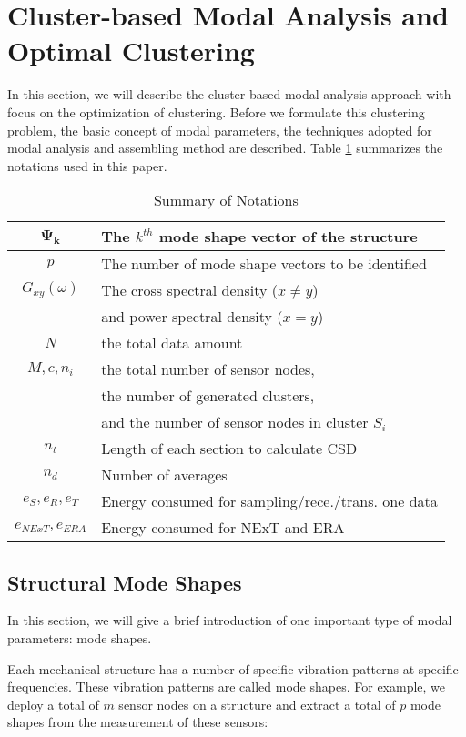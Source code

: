 \section{Cluster-based Modal Analysis and Optimal Clustering}
\label{sec:problem}
In this section, we will describe the cluster-based modal analysis approach with focus on the optimization of clustering. Before we formulate this clustering problem, the basic concept of modal parameters, the techniques adopted for modal analysis and assembling method are described. Table \ref{tab:Table1} summarizes the notations used in this paper.

\begin{table}
	\centering
\begin{tabular}{|c|l|}
\hline
\(\mathbf{\Psi_k}\)& The \(k^{th}\) mode shape vector of the structure\\
\hline
\(p\) &	The number of mode shape vectors to be identified\\
\hline
\(G_{xy}(\omega)\)& The cross spectral density (\(x\neq y\))\\
\ & and power spectral density (\(x=y\))\\
\hline
\(N\) & the total data amount\\
\hline
\(M,c,n_i\) & the total number of sensor nodes,\\ 
\ & the number of generated clusters, \\
\ & and the number of sensor nodes in cluster \(S_i\)\\
\hline
\(n_t\)	& Length of each section to calculate CSD\\
\hline
\(n_d\)	& Number of averages\\
\hline
\(e_S, e_R, e_T \)& Energy consumed for sampling/rece./trans. one data\\
\hline
\(e_{NExT}, e_{ERA}\)	& Energy consumed for NExT and ERA\\
\hline
\end{tabular}
	\caption{Summary of Notations}
	\label{tab:Table1}
\end{table}

\subsection{Structural Mode Shapes}
In this section, we will give a brief introduction of one important type of modal parameters: mode shapes. 

Each mechanical structure has a number of specific vibration patterns at specific frequencies. These vibration patterns are called mode shapes. For example, we deploy a total of \(m\) sensor nodes on a structure and extract a total of \(p\) mode shapes from the measurement of these sensors:


